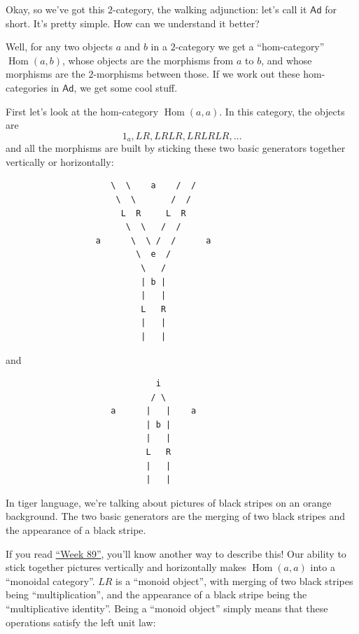 \documentclass{article}
\begin{document}
Okay, so we've got this \(2\)-category, the walking adjunction: let's
call it \(\mathsf{Ad}\) for short. It's pretty simple. How can we
understand it better?

Well, for any two objects \(a\) and \(b\) in a \(2\)-category we get a
``hom-category'' \(\operatorname{Hom}(a,b)\), whose objects are the
morphisms from \(a\) to \(b\), and whose morphisms are the
\(2\)-morphisms between those. If we work out these hom-categories in
\(\mathsf{Ad}\), we get some cool stuff.

First let's look at the hom-category \(\operatorname{Hom}(a,a)\). In
this category, the objects are \[1_a, LR, LRLR, LRLRLR, \ldots\] and all
the morphisms are built by sticking these two basic generators together
vertically or horizontally:

\begin{verbatim}
                     \  \    a    /  /  
                      \  \       /  /
                       L  R     L  R
                        \  \   /  /
                  a      \  \ /  /      a
                          \  e  /
                           \   /
                           | b |
                           |   |
                           L   R
                           |   |
                           |   |   
\end{verbatim}

and

\begin{verbatim}
                              i
                             / \
                     a      |   |    a
                            | b |     
                            |   |
                            L   R   
                            |   |
                            |   |
\end{verbatim}

In tiger language, we're talking about pictures of black stripes on an
orange background. The two basic generators are the merging of two black
stripes and the appearance of a black stripe.

If you read \protect\hyperlink{week89}{``Week 89''}, you'll know another
way to describe this! Our ability to stick together pictures vertically
and horizontally makes \(\operatorname{Hom}(a,a)\) into a ``monoidal
category''. \(LR\) is a ``monoid object'', with merging of two black
stripes being ``multiplication'', and the appearance of a black stripe
being the ``multiplicative identity''. Being a ``monoid object'' simply
means that these operations satisfy the left unit law:
\end{document}

